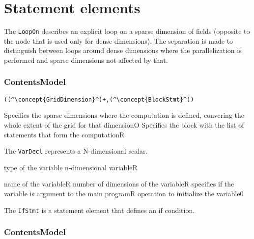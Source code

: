 \section{Statement elements}


The {\tt LoopOn} describes an explicit loop on a sparse dimension of
fields (opposite to the  node that is 
used only for dense dimensions).
The separation is made to distinguish between loops around 
dense dimensions where the parallelization is performed and sparse 
dimensions not affected by that.  

\subsubsection*{ContentsModel}{}

\begin{lstlisting}[style=default,frame=none]
((^\concept{GridDimension}^)+,(^\concept{BlockStmt}^))
\end{lstlisting}

\begin{HIRChildElements}
	{Specifies the sparse dimensions where the computation is defined,
		convering the whole extent of the grid for that dimension}{O}
	{Specifies the block with the list of statements that form the computation}{R}
\end{HIRChildElements}



The {\tt VarDecl} represents a N-dimensional scalar.

\begin{HIRChildElements}
	{type of the variable n-dimensional variable}{R}
\end{HIRChildElements}

\begin{HIRAttributes}
	{name of the variable}{R}
	{number of dimensions of the variable}{R}
    {specifies if the variable is argument to the main program}{R}
	{operation to initialize the variable}{0}
\end{HIRAttributes}

The {\tt IfStmt} is a statement element that defines an if condition.

\subsubsection*{ContentsModel}{}

